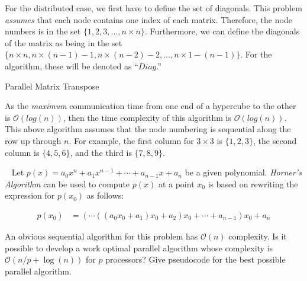 \documentclass[addpoints]{exam}
\newcommand{\BigO}[1]{\mathcal{O}\left( #1\right)}
\newcommand{\ceil}[1]{\left \lceil #1 \right \rceil }
\newcommand{\Mod}[1]{\ \text{\bf mod}\ #1}
\begin{document}
\begin{questions}
\begin{solution}
For the distributed case, we first have to define the set of diagonals. This problem {\em assumes} that each node contains one index of each matrix. Therefore, the node numbers is in the set $\{1,2,3,\ldots,n\times n\}$. Furthermore, we can define the diagonals of the matrix as being in the set $\{n\times n, n\times (n-1) - 1, n\times (n-2) - 2,\ldots,n\times 1 - (n-1)\}$. For the algorithm, these will be denoted as ``$Diag$.''

\begin{algorithm}[H]
\caption{Parallel Matrix Transpose}
\begin{algorithmic}
\STATE{$column \leftarrow \ceil{\frac{nodeID}{n}}$}
\STATE{$row \leftarrow nodeID \Mod{n}$}
\ENDIF
{}
\ENDIF
\end{algorithmic}
\end{algorithm}

As the {\em maximum} communication time from one end of a hypercube to the other is $\BigO{log(n)}$, then the time complexity of this algorithm is $\BigO{log(n)}$. This above algorithm assumes that the node numbering is sequential along the row up through $n$. For example, the first column for $3\times 3$ is $\{1, 2, 3\}$, the second column is $\{4, 5, 6\}$, and the third is $\{7, 8, 9\}$.

\end{solution}


\ \newpage
{}
Let $p(x) = a_{0}x^{n} + a_{1}x^{n-1} + \cdots + a_{n-1}x + a_{n}$ be a given polynomial. {\em Horner's Algorithm} can be used to compute $p(x)$ at a point $x_{0}$ is based on rewriting the expression for $p(x_{0})$ as follows:

\begin{align*}
p(x_{0}) &= \left( \cdots \left(\left( a_{0}x_{0} + a_{1}\right) x_{0} + a_{2}\right)x_{0} + \cdots + a_{n-1}\right)x_{0} + a_{n}
\end{align*}

An obvious sequential algorithm for this problem has $\BigO{n}$ complexity. Is it possible to develop a work optimal parallel algorithm whose complexity is $\BigO{n/p + \log(n)}$ for $p$ processors? Give pseudocode for the best possible parallel algorithm.


\end{questions}
\end{document}
